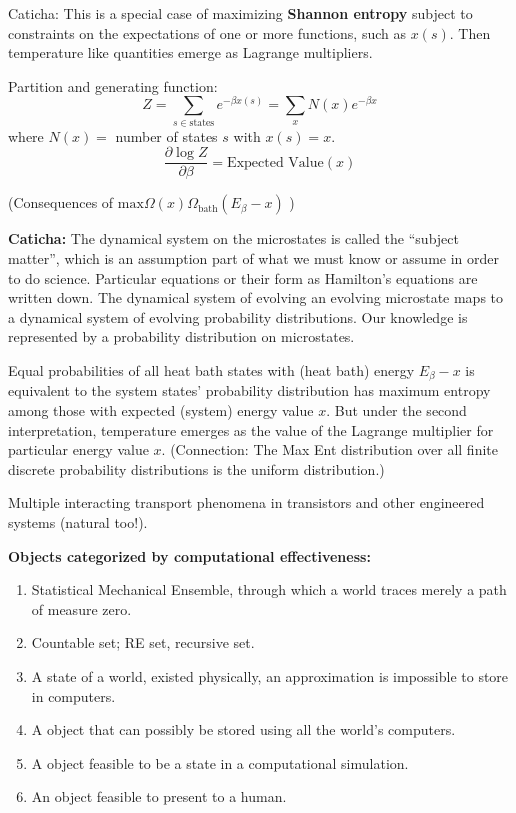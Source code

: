 \documentclass{article}
\begin{document}
Caticha: This is a special case of maximizing \textbf{Shannon entropy}
subject to constraints on the expectations of one or more functions, such as 
$x(s)$.  Then temperature like quantities emerge as Lagrange multipliers.

Partition and generating function:
\[
Z = \sum_{s\in\text{states}}e^{-\beta x(s)} = \sum_{x}N(x)e^{-\beta x} 
\]
where $N(x)= $ number of states $s$ with $x(s) = x$.
\[
\frac{\partial{\log Z}}{\partial\beta}
=
\text{Expected Value}(x)
\]

(Consequences of $\text{max}\Omega(x)\Omega_{\text{bath}}(E_\beta -x )$
\cite{CatichaEIFP})

\textbf{Caticha:} The dynamical system on the microstates is called
the ``subject matter'', which is an assumption part of what we must know or 
assume
in order to do science.  Particular equations or their form as
Hamilton's equations are written down.
The dynamical system of evolving an evolving 
microstate maps to a dynamical system of evolving probability 
distributions.  Our knowledge is represented by a probability distribution
on microstates.  

Equal probabilities of all heat bath states with (heat bath) energy 
$E_\beta -x$ is 
equivalent to the system states' probability distribution has maximum
entropy among those with expected (system) energy value $x$.  But under the
second interpretation, temperature emerges as the value of the Lagrange 
multiplier for particular energy value $x$.  (Connection: The Max Ent
distribution over all finite discrete probability distributions is the uniform
distribution.)  



Multiple interacting transport phenomena in transistors and other 
engineered systems (natural too!).
 
\textbf{Objects categorized by computational effectiveness:}
\begin{enumerate}
\item Statistical Mechanical Ensemble, through which a world traces
merely a path of measure zero.
\item Countable set; RE set, recursive set.
\item A state of a world, existed physically, an approximation is 
impossible to store in computers.
\item A object that can possibly be stored using all the world's 
computers.
\item A object feasible to be a state in a computational simulation.
\item An object feasible to present to a human.
\end{enumerate}
\end{document}

